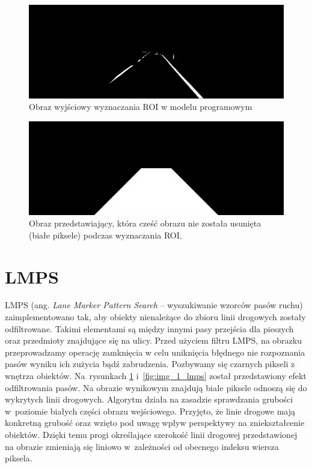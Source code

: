 \begin{figure}[h]
	\centering
	\includegraphics[scale=0.3]{obraz_roi.png}
	\caption{Obraz wyjściowy wyznaczania ROI w modelu programowym}
	\label{fig:out_ROI}
\end{figure}
\begin{figure}[h]
	\centering
	\includegraphics[scale=0.3]{roi.png}
	\caption{Obraz przedstawiający, która cześć obrazu nie została usunięta (białe piksele) podczas wyznaczania ROI. }
	\label{fig:out_ROI_mask}
\end{figure}


\section{LMPS}
LMPS (ang. \textit{Lane Marker Pattern Search} -- wyszukiwanie wzorców pasów ruchu) zaimplementowano tak, aby obiekty nienależące do zbioru linii drogowych zostały odfiltrowane. 
Takimi elementami są między innymi pasy przejścia dla pieszych oraz przedmioty znajdujące się na ulicy. 
Przed użyciem filtru LMPS, na obrazku przeprowadzamy operację zamknięcia w celu uniknięcia błędnego nie rozpoznania pasów wyniku ich zużycia bądź zabrudzenia. Pozbywamy się czarnych pikseli z wnętrza obiektów.
Na~rysunkach \ref{fig:out_ROI} i~\ref{fig:img_1_lmps} został przedstawiony efekt odfiltrowania pasów. 
Na obrazie wynikowym znajdują białe piksele odnoszą się do wykrytych linii drogowych. 
Algorytm działa na zasadzie sprawdzania grubości w~poziomie białych części obrazu wejściowego. 
Przyjęto, że linie drogowe mają konkretną grubość oraz wzięto pod uwagę wpływ perspektywy na zniekształcenie obiektów. 
Dzięki temu progi określające szerokość linii drogowej przedstawionej na obrazie zmieniają się liniowo w~zależności od obecnego indeksu wiersza piksela.

